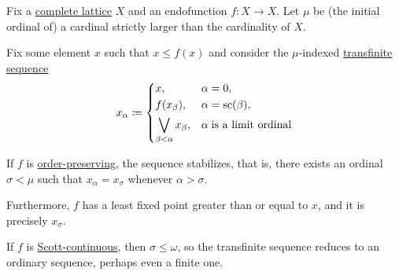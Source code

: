 \begin{theorem}\label{thm:knaster_tarski_iteration}
  Fix a \hyperref[def:complete_lattice]{complete lattice} \( X \) and an endofunction \( f: X \to X \). Let \( \mu \) be (the initial ordinal of) a cardinal strictly larger than the cardinality of \( X \).

  Fix some element \( x \) such that \( x \leq f(x) \) and consider the \( \mu \)-indexed \hyperref[def:transfinite_sequence]{transfinite sequence}
  \begin{equation*}
    x_\alpha \coloneqq \begin{dcases}
      x,                                &\alpha = 0, \\
      f(x_\beta),                       &\alpha = \op{sc}(\beta), \\
      \bigvee_{\beta < \alpha} x_\beta, &\alpha \T{is a limit ordinal} \\
    \end{dcases}
  \end{equation*}

  \begin{thmenum}
     If \( f \) is \hyperref[def:order_function]{order-preserving}, the sequence stabilizes, that is, there exists an ordinal \( \sigma < \mu \) such that \( x_\alpha = x_\sigma \) whenever \( \alpha > \sigma \).

     Furthermore, \( f \) has a least fixed point greater than or equal to \( x \), and it is precisely \( x_\sigma \).

     If \( f \) is \hyperref[def:scott_continuous]{Scott-continuous}, then \( \sigma \leq \omega \), so the transfinite sequence reduces to an ordinary sequence, perhaps even a finite one.
  \end{thmenum}
\end{theorem}
